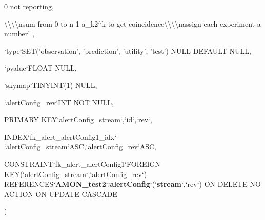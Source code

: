 {{\begin{DoxyParamCaption}
\item[{0 not}]{reporting, }
\item[{\textbackslash{}\textbackslash{}\textbackslash{}\textbackslash{}nsum from 0 to n-\/1 a\-\_\-k2$^\wedge$k to get coincidence\textbackslash{}\textbackslash{}\textbackslash{}\textbackslash{}nassign each experiment a number'}]{, }
\item[{`type`S\-E\-T('observation', 'prediction', 'utility', 'test') N\-U\-L\-L D\-E\-F\-A\-U\-L\-T}]{N\-U\-L\-L, }
\item[{`pvalue`F\-L\-O\-A\-T}]{N\-U\-L\-L, }
\item[{`skymap`T\-I\-N\-Y\-I\-N\-T(1)}]{N\-U\-L\-L, }
\item[{`alert\-Config\-\_\-rev`I\-N\-T N\-O\-T}]{N\-U\-L\-L, }
\item[{P\-R\-I\-M\-A\-R\-Y }]{K\-E\-Y`alert\-Config\-\_\-stream`,`id`,`rev`, }
\item[{I\-N\-D\-E\-X`fk\-\_\-alert\-\_\-alert\-Config1\-\_\-idx`}]{`alert\-Config\-\_\-stream`\-A\-S\-C,`alert\-Config\-\_\-rev`\-A\-S\-C, }
\item[{C\-O\-N\-S\-T\-R\-A\-I\-N\-T`fk\-\_\-alert\-\_\-alert\-Config1`F\-O\-R\-E\-I\-G\-N K\-E\-Y(`alert\-Config\-\_\-stream`,`alert\-Config\-\_\-rev`) R\-E\-F\-E\-R\-E\-N\-C\-E\-S`{\bf A\-M\-O\-N\-\_\-test2}`.`{\bf alert\-Config}`(`{\bf stream}`,`rev`) O\-N D\-E\-L\-E\-T\-E N\-O A\-C\-T\-I\-O\-N O\-N U\-P\-D\-A\-T\-E}]{C\-A\-S\-C\-A\-D\-E}
\end{DoxyParamCaption}
)}}\label{db__mc__build_8sql_a38a604686c7d372f50752e893e3e1e21}
